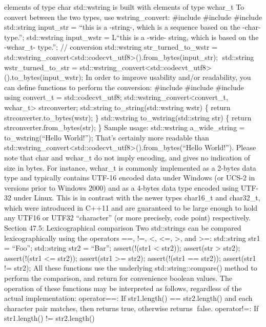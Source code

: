 elements of type char std::wstring is built with elements of type
wchar\_t To convert between the two types, use wstring\_convert:
\#include \#include \#include std::string input\_str = ``this is a
-string-, which is a sequence based on the -char- type.''; std::wstring
input\_wstr = L``this is a -wide- string, which is based on the
-wchar\_t- type.''; // conversion std::wstring str\_turned\_to\_wstr =
std::wstring\_convert\textless std::codecvt\_utf8\textgreater().from\_bytes(input\_str);
std::string wstr\_turned\_to\_str =
std::wstring\_convert\textless std::codecvt\_utf8\textgreater().to\_bytes(input\_wstr);
In order to improve usability and/or readability, you can deﬁne
functions to perform the conversion: \#include \#include \#include using
convert\_t = std::codecvt\_utf8;
std::wstring\_convert\textless convert\_t, wchar\_t\textgreater{}
strconverter; std::string to\_string(std::wstring wstr) \{ return
strconverter.to\_bytes(wstr); \} std::wstring to\_wstring(std::string
str) \{ return strconverter.from\_bytes(str); \} Sample usage:
std::wstring a\_wide\_string = to\_wstring(``Hello World!''); That's
certainly more readable than
std::wstring\_convert\textless std::codecvt\_utf8\textgreater().from\_bytes(``Hello
World!''). Please note that char and wchar\_t do not imply encoding, and
gives no indication of size in bytes. For instance, wchar\_t is commonly
implemented as a 2-bytes data type and typically contains UTF-16 encoded
data under Windows (or UCS-2 in versions prior to Windows 2000) and as a
4-bytes data type encoded using UTF-32 under Linux. This is in contrast
with the newer types char16\_t and char32\_t, which were introduced in
C++11 and are guaranteed to be large enough to hold any UTF16 or UTF32
``character'' (or more precisely, code point) respectively. Section
47.5: Lexicographical comparison Two std::strings can be compared
lexicographically using the operators ==, !=, \textless, \textless=,
\textgreater, and \textgreater=: std::string str1 = ``Foo''; std::string
str2 = ``Bar''; assert(!(str1 \textless{} str2)); assert(str
\textgreater{} str2); assert(!(str1 \textless= str2)); assert(str1
\textgreater= str2); assert(!(str1 == str2)); assert(str1 != str2); All
these functions use the underlying std::string::compare() method to
perform the comparison, and return for convenience boolean values. The
operation of these functions may be interpreted as follows, regardless
of the actual implementation: operator==: If str1.length() ==
str2.length() and each character pair matches, then returns true,
otherwise returns false. operator!=: If str1.length() != str2.length()
